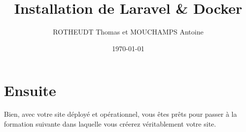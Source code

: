 \documentclass[internal]{nhitec_design}
\author{ROTHEUDT Thomas et MOUCHAMPS Antoine}
\date{\today}
\title{Installation de Laravel \& Docker}
\begin{document}
\maketitle
\newpage
{
    \hypersetup{linkcolor=black}
    \color{red_nhitec}
    \tableofcontents
}

\newpage









\section[Ensuite]{Ensuite\label{sec:suite}}

Bien, avec votre site déployé et opérationnel, vous êtes prêts pour passer à la formation suivante dans laquelle vous créerez véritablement votre site.
\end{document}
